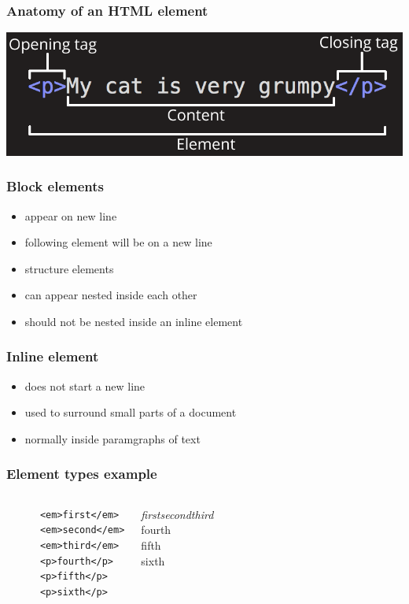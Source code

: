 \documentclass{beamer}
\begin{document}
\begin{frame}
  \frametitle{Anatomy of an HTML element}
  \begin{center}
    \includegraphics[scale=.35]{html-element.png}
  \end{center}
\end{frame}

\begin{frame}
  \frametitle{Block elements}
  \begin{itemize}
    \item appear on new line
    \item following element will be on a new line
    \item structure elements
    \item can appear nested inside each other
    \item should not be nested inside an inline element
  \end{itemize}
\end{frame}

\begin{frame}
  \frametitle{Inline element}
  \begin{itemize}
    \item does not start a new line
    \item used to surround small parts of a document
    \item normally inside paramgraphs of text
  \end{itemize}
\end{frame}

\begin{frame}[fragile]
  \frametitle{Element types example}
  \begin{columns}
    \begin{lstlisting}
      <em>first</em>
      <em>second</em>
      <em>third</em>
      <p>fourth</p>
      <p>fifth</p>
      <p>sixth</p>
    \end{lstlisting}
    \textit{firstsecondthird}\\
    fourth\\
    fifth\\
    sixth
  \end{columns}
\end{frame}
\end{document}
